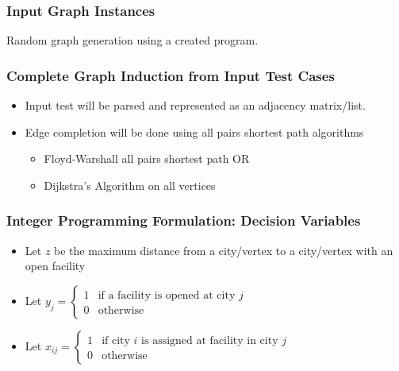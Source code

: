 \documentclass[12pt]{beamer}
\begin{document}
\begin{frame}
\frametitle{Input Graph Instances}
\begin{center}

		Random graph generation using a created program.
		
\end{center}
\end{frame}


\begin{frame}
\frametitle{Complete Graph Induction from Input Test Cases}
\begin{itemize}
\item Input test will be parsed and represented as an adjacency matrix/list.
\item Edge completion will be done using all pairs shortest path algorithms
\begin{itemize}
	\item Floyd-Warshall all pairs shortest path OR
	\item Dijkstra's Algorithm on all vertices
\end{itemize}

\end{itemize}
\end{frame}

\begin{frame}
\frametitle{Integer Programming Formulation: Decision Variables}
\begin{itemize}
\item Let $z$ be the maximum distance from a city/vertex to a city/vertex with an open facility
\item Let
	$
	y_j = 
	\begin{cases}
	1	& \text{if a facility is opened at city } j \\
	0	& \text{otherwise }
	\end{cases}
	$
\item Let $x_{ij}= 
	\begin{cases}
	1	& \text{if city } i  \text{ is assigned at facility in city } j \\
	0	& \text{otherwise }
	\end{cases}
	$ 
\end{itemize}
\end{frame}
\end{document}

